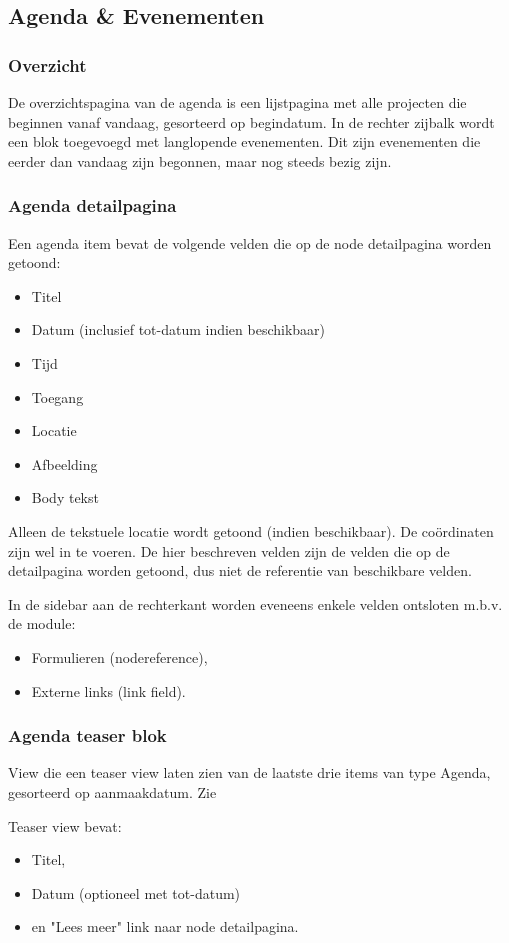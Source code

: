 \subsection{Agenda \& Evenementen}\label{agenda-en-evenementen}

\subsubsection{Overzicht}\label{agendaoverzicht}

De overzichtspagina van de agenda is een lijstpagina met alle projecten die beginnen vanaf vandaag, gesorteerd op begindatum. In de rechter zijbalk wordt een blok toegevoegd met langlopende evenementen. Dit zijn evenementen die eerder dan vandaag zijn begonnen, maar nog steeds bezig zijn.

\subsubsection{Agenda detailpagina}\label{agenda-detail}

Een agenda item bevat de volgende velden die op de node detailpagina worden getoond:
\begin{itemize}
\item Titel
\item Datum (inclusief tot-datum indien beschikbaar)
\item Tijd
\item Toegang
\item Locatie
\item Afbeelding
\item Body tekst
\end{itemize}
Alleen de tekstuele locatie wordt getoond (indien beschikbaar). De co\"{o}rdinaten zijn wel in te voeren. De hier beschreven velden zijn de velden die op de detailpagina worden getoond, dus niet de referentie van beschikbare velden.

In de sidebar aan de rechterkant worden eveneens enkele velden ontsloten m.b.v. de  module:
\begin{itemize}
\item Formulieren (nodereference),
\item Externe links (link field).
\end{itemize}

\subsubsection{Agenda teaser blok}

View die een teaser view laten zien van de laatste drie items van type Agenda, gesorteerd op aanmaakdatum. Zie 

Teaser view bevat:
\begin{itemize}
\item Titel,
\item Datum (optioneel met tot-datum)
\item en "Lees meer" link naar node detailpagina.
\end{itemize}
